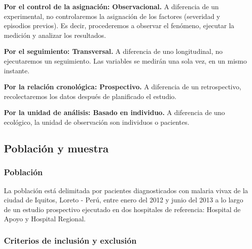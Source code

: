 \documentclass[]{article}
\begin{document}
\textbf{Por el control de la asignación: Observacional.} A diferencia de
un experimental, no controlaremos la asignación de los factores
(severidad y episodios previos). Es decir, procederemos a observar el
fenómeno, ejecutar la medición y analizar los resultados.

\textbf{Por el seguimiento: Transversal.} A diferencia de uno
longitudinal, no ejecutaremos un seguimiento. Las variables se medirán
una sola vez, en un mismo instante.

\textbf{Por la relación cronológica: Prospectivo.} A diferencia de un
retrospectivo, recolectaremos los datos después de planificado el
estudio.

\textbf{Por la unidad de análisis: Basado en individuo.} A diferencia de
uno ecológico, la unidad de observación son individuos o pacientes.

\subsection{Población y muestra}\label{poblacion-y-muestra}

\subsubsection{Población}\label{poblacion}

La población está delimitada por pacientes diagnosticados con malaria
vivax de la ciudad de Iquitos, Loreto - Perú, entre enero del 2012 y
junio del 2013 a lo largo de un estudio prospectivo ejecutado en dos
hospitales de referencia: Hospital de Apoyo y Hospital Regional.

\subsubsection{Criterios de inclusión y
exclusión}\label{criterios-de-inclusion-y-exclusion}
\end{document}
